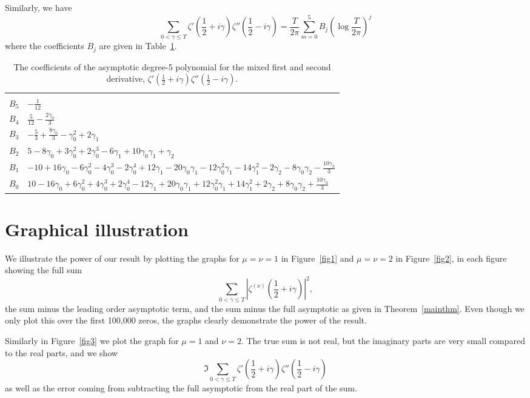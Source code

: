 \documentclass[12pt, a4paper,reqno]{amsart}
\theoremstyle{definition}
\numberwithin{equation}{section}
\begin{document}
Similarly, we have
\[
\sum_{0<\gamma\le T} \zeta'\left(\frac{1}{2}+i\gamma\right) \zeta''\left(\frac{1}{2}-i\gamma\right) = \frac{T}{2\pi} \sum_{m=0}^5 B_j \left( \log\frac{T}{2\pi}\right)^j
\]
where the coefficients $B_j$ are given in Table~\ref{tab:MixedDeriv}.
\begin{table}[hp]
    \begin{tabular}{|l|p{}|}
    \hline
    &\\
    $B_5$ & $-\frac{1}{12}$ \\[2ex]
    $B_4$ & $\frac{5}{12}-\frac{2 \gamma_0 }{3}$ \\[2ex]
    $B_3$ & $-\frac{5}{3}+\frac{8 \gamma_0 }{3}-\gamma_0^2 + 2 \gamma_1$ \\[2ex]
    $B_2$ & $5-8 \gamma_0 +3 \gamma_0^2+2 \gamma_0^3 -6 \gamma_1+10 \gamma_0  \gamma_1+\gamma_2$ \\[2ex]
    $B_1$ & $-10+16 \gamma_0 -6 \gamma_0^2-4 \gamma_0^3-2 \gamma_0^4 + 12 \gamma_1-20 \gamma_0  \gamma_1-12 \gamma_0^2 \gamma_1-14 \gamma_1^2-2 \gamma_2-8 \gamma_0  \gamma_2-\frac{10 \gamma_3}{3}$ \\[2ex]
    $B_0$ & $10-16 \gamma_0 +6 \gamma_0^2+4 \gamma_0^3+2 \gamma_0^4 -12 \gamma_1+20 \gamma_0  \gamma_1+12 \gamma_0^2 \gamma_1+14 \gamma_1^2+2 \gamma_2+8 \gamma_0  \gamma_2+\frac{10 \gamma_3}{3}$\\[2ex]
    \hline
    \end{tabular}
    \caption{The coefficients of the asymptotic degree-5 polynomial for the mixed first and second derivative, $\zeta'\left(\frac{1}{2}+i\gamma\right) \zeta''\left(\frac{1}{2}-i\gamma\right)$.}\label{tab:MixedDeriv}
\end{table}

\section{Graphical illustration}\label{app:graphs}

We illustrate the power of our result by plotting the graphs for $\mu=\nu=1$ in Figure~\ref{fig1} and $\mu=\nu=2$ in Figure~\ref{fig2}, in each figure showing the full sum
\[
\sum_{0<\gamma\le T}\left|\zeta^{(\nu)} \left(\frac{1}{2}+i\gamma\right)\right|^2 ,
\]
the sum minus the leading order asymptotic term, and the sum minus the full asymptotic as given in Theorem~\ref{mainthm}. Even though we only plot this over the first 100,000 zeros, the graphs clearly demonstrate the power of the result.

Similarly in Figure~\ref{fig3} we plot the graph for $\mu=1$ and $\nu=2$. The true sum is not real, but the imaginary parts are very small compared to the real parts, and we show 
\[
\Im \sum_{0<\gamma\le T} \zeta'\left(\frac{1}{2}+i\gamma\right) \zeta''\left(\frac{1}{2}-i\gamma\right) 
\]
as well as the error coming from subtracting the full asymptotic from the real part of the sum.
\end{document}
